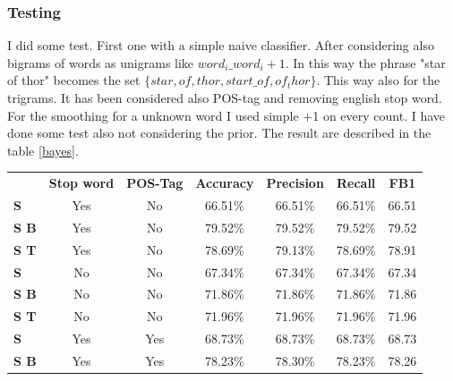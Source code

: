 \documentclass[a4paper,8pt,oneside]{article}
\begin{document}
		\subsubsection{Testing}
			I did some test. First one with a simple naive classifier. After considering also bigrams of words as unigrams like $word_i\_word_i+1$. In this way the phrase "star of thor" becomes the set $\{star,of,thor,start\_of,of_thor\}$. This way also for the trigrams. It has been considered also POS-tag and removing english stop word. For the smoothing for a unknown word I used simple +1 on every count. I have done some test also not considering the prior. 
			The result are described in the table \ref{bayes}.
			\begin{table}[h]
			\begin{tabular}{lcccccc}
			                              & \textbf{Stop word} & \textbf{POS-Tag} & \textbf{Accuracy} & \textbf{Precision} & \textbf{Recall} & \textbf{FB1} \\
			\textbf{S}               & Yes                & No               & 66.51\%           & 66.51\%            & 66.51\%         & 66.51             \\
			\cellcolor[HTML]{34FF34}\textbf{S B}  & \cellcolor[HTML]{34FF34}Yes                & \cellcolor[HTML]{34FF34}No               & \cellcolor[HTML]{34FF34}79.52\%           & \cellcolor[HTML]{34FF34}79.52\%            & \cellcolor[HTML]{34FF34}79.52\%         & \cellcolor[HTML]{34FF34}79.52             \\
			\textbf{S T} & Yes                & No               & 78.69\%           & 79.13\%            & 78.69\%         & 78.91             \\
			\textbf{S}               & No                 & No               & 67.34\%           & 67.34\%            & 67.34\%         & 67.34             \\
			\textbf{S B}  & No                 & No               & 71.86\%           & 71.86\%            & 71.86\%         & 71.86             \\
			\textbf{S T} & No                 & No               & 71.96\%           & 71.96\%            & 71.96\%         & 71.96             \\
			\textbf{S}               & Yes                & Yes              & 68.73\%           & 68.73\%            & 68.73\%         & 68.73             \\
			\textbf{S B}  & Yes                & Yes              & 78.23\%           & 78.30\%            & 78.23\%         & 78.26             \\

\end{tabular}
\end{table}
\end{document}
